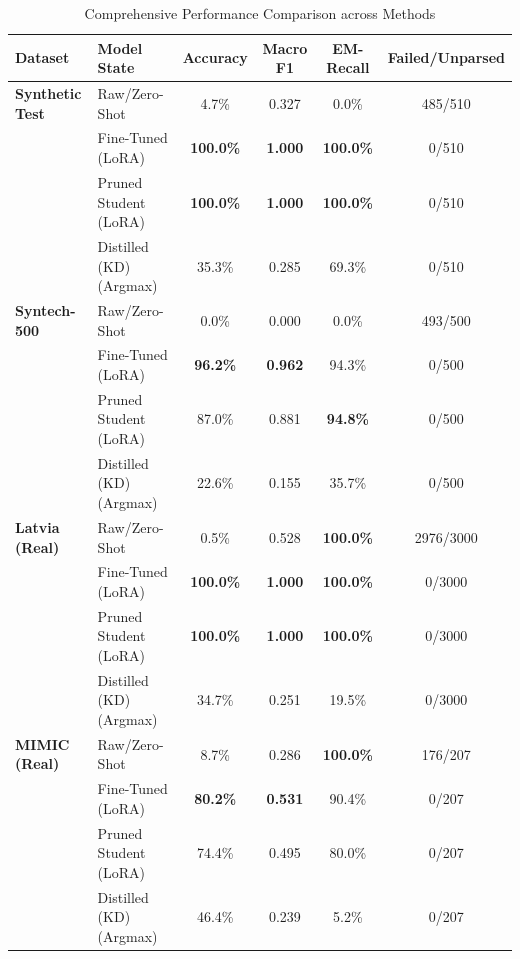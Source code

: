 \documentclass[a4paper, 12pt]{article}
\begin{document}
\begin{table}[h]
\centering
\caption{Comprehensive Performance Comparison across Methods}
\label{tab:main_results}
\small
\begin{tabular}{llcccc}
\toprule
Dataset & Model State & Accuracy & Macro F1 & EM-Recall & Failed/Unparsed \\
\midrule
\textbf{Synthetic Test} & Raw/Zero-Shot & 4.7\% & 0.327 & 0.0\% & 485/510 \\
                       & Fine-Tuned (LoRA) & \textbf{100.0\%} & \textbf{1.000} & \textbf{100.0\%} & 0/510 \\
                       & Pruned Student (LoRA) & \textbf{100.0\%} & \textbf{1.000} & \textbf{100.0\%} & 0/510 \\
                       & Distilled (KD) (Argmax) & 35.3\% & 0.285 & 69.3\% & 0/510 \\
\midrule
\textbf{Syntech-500}   & Raw/Zero-Shot & 0.0\% & 0.000 & 0.0\% & 493/500 \\
                       & Fine-Tuned (LoRA) & \textbf{96.2\%} & \textbf{0.962} & 94.3\% & 0/500 \\
                       & Pruned Student (LoRA) & 87.0\% & 0.881 & \textbf{94.8\%} & 0/500 \\
                       & Distilled (KD) (Argmax) & 22.6\% & 0.155 & 35.7\% & 0/500 \\
\midrule
\textbf{Latvia (Real)}  & Raw/Zero-Shot & 0.5\% & 0.528 & \textbf{100.0\%} & 2976/3000 \\
                       & Fine-Tuned (LoRA) & \textbf{100.0\%} & \textbf{1.000} & \textbf{100.0\%} & 0/3000 \\
                       & Pruned Student (LoRA) & \textbf{100.0\%} & \textbf{1.000} & \textbf{100.0\%} & 0/3000 \\
                       & Distilled (KD) (Argmax) & 34.7\% & 0.251 & 19.5\% & 0/3000 \\
\midrule
\textbf{MIMIC (Real)}   & Raw/Zero-Shot & 8.7\% & 0.286 & \textbf{100.0\%} & 176/207 \\
                       & Fine-Tuned (LoRA) & \textbf{80.2\%} & \textbf{0.531} & 90.4\% & 0/207 \\
                       & Pruned Student (LoRA) & 74.4\% & 0.495 & 80.0\% & 0/207 \\
                       & Distilled (KD) (Argmax) & 46.4\% & 0.239 & 5.2\% & 0/207 \\
\bottomrule
\end{tabular}
\end{table}
\end{document}
